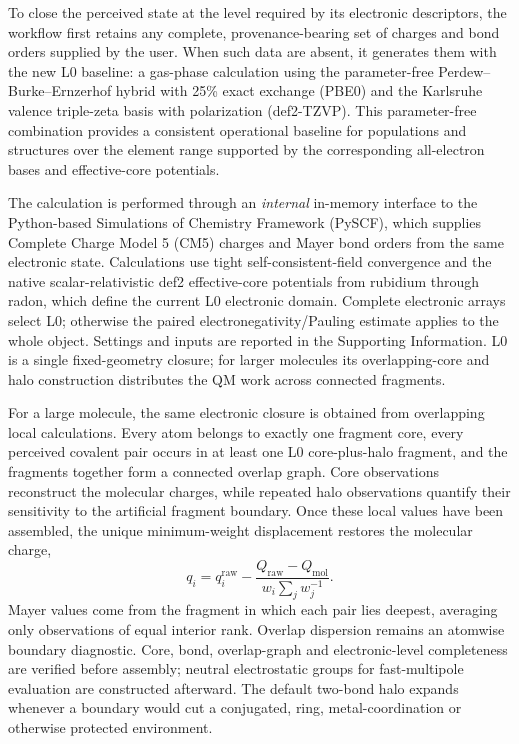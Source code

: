 \documentclass[journal=jctcce,manuscript=article]{achemso}
\begin{document}
To close the perceived state at the level required by its electronic
descriptors, the workflow first retains any complete, provenance-bearing set of
charges and bond orders supplied by the user.  When such data are absent, it
generates them with the new L0 baseline: a gas-phase calculation using the
parameter-free Perdew--Burke--Ernzerhof hybrid with 25\% exact exchange (PBE0)
and the Karlsruhe valence triple-zeta basis with polarization
(def2-TZVP).\cite{pbe0_1999,def2_2005}  This parameter-free combination
provides a consistent operational baseline for populations and structures over
the element range supported by the corresponding all-electron bases and
effective-core potentials.

The calculation is performed through an \emph{internal} in-memory interface to
the Python-based Simulations of Chemistry Framework (PySCF), which supplies
Complete Charge Model 5 (CM5) charges and Mayer bond orders from the same
electronic state.\cite{pyscf_2018,cm5_2012,mayer_bond_order_1983} Calculations use tight
self-consistent-field convergence and the native scalar-relativistic def2
effective-core potentials from rubidium through radon, which define the
current L0 electronic domain.  Complete electronic arrays select L0;
otherwise the paired electronegativity/Pauling estimate applies to the whole
object.  Settings and inputs are reported in the Supporting Information.  L0
is a single fixed-geometry closure; for larger molecules its overlapping-core
and halo construction distributes the QM work across connected fragments.

For a large molecule, the same electronic closure is obtained from overlapping
local calculations.  Every atom belongs to exactly one fragment core, every
perceived covalent pair occurs in at least one L0 core-plus-halo fragment, and
the fragments together form a connected overlap graph.  Core observations
reconstruct the molecular charges, while repeated halo observations quantify
their sensitivity to the artificial fragment boundary.  Once these local
values have been assembled, the unique minimum-weight displacement restores
the molecular charge,
\begin{equation}
 q_i=q_i^{\mathrm{raw}}-
 \frac{Q_{\mathrm{raw}}-Q_{\mathrm{mol}}}
 {w_i\sum_jw_j^{-1}}.
\label{eq:l0-charge-assembly}
\end{equation}
Mayer values come from the fragment in which each pair lies deepest, averaging
only observations of equal interior rank.  Overlap dispersion remains an
atomwise boundary diagnostic.  Core, bond, overlap-graph and electronic-level
completeness are verified before assembly; neutral electrostatic groups for
fast-multipole evaluation are constructed afterward.  The default two-bond
halo expands whenever a boundary would cut a conjugated, ring,
metal-coordination or otherwise protected environment.
\end{document}
